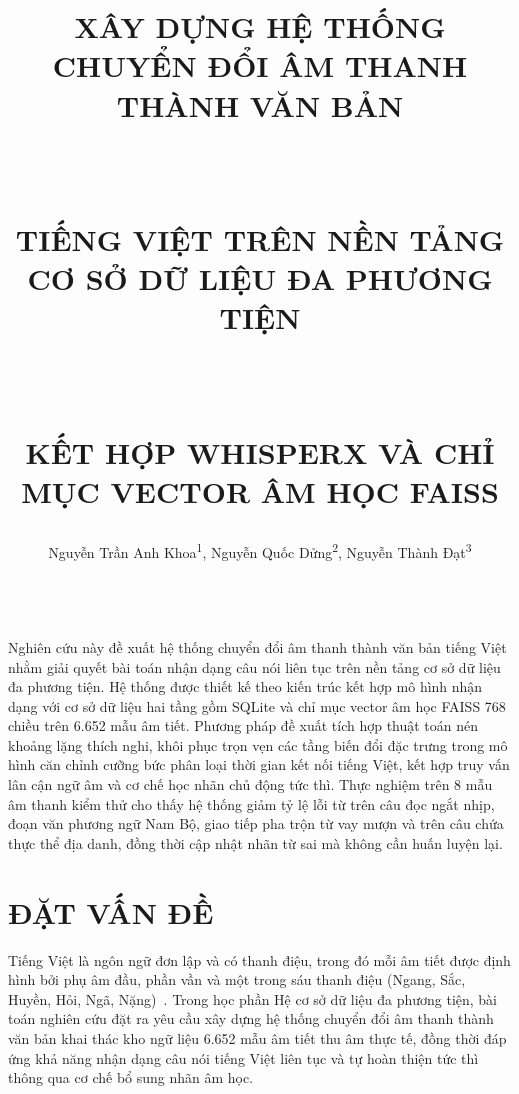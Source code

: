 \documentclass[12pt,a4paper]{article}
\title{\parbox{\textwidth}{\centering
  \titlefontsize 
  \setlength{\baselineskip}{16pt}
  \setlength{\lineskip}{0pt}
  \setlength{\lineskiplimit}{-1000pt}
  \strut XÂY DỰNG HỆ THỐNG CHUYỂN ĐỔI ÂM THANH THÀNH VĂN BẢN\strut\\
  \strut TIẾNG VIỆT TRÊN NỀN TẢNG CƠ SỞ DỮ LIỆU ĐA PHƯƠNG TIỆN\strut\\
  \strut KẾT HỢP WHISPERX VÀ CHỈ MỤC VECTOR ÂM HỌC FAISS\strut}}
\author{
  {\authorfontsize Nguyễn Trần Anh Khoa\textsuperscript{1}, Nguyễn Quốc Dửng\textsuperscript{2}, Nguyễn Thành Đạt\textsuperscript{3}}\\[2pt]
  \makebox[\textwidth][r]{\affilfontsize\textsuperscript{1,2,3} Trường Đại học Kỹ thuật - Công nghệ Cần Thơ}\\[2pt]
  \makebox[\textwidth][r]{\affilfontsize\textit{Tác giả liên hệ: Nguyễn Trần Anh Khoa, ntakhoahttt2211026@student.ctuet.edu.vn}}%
}
\date{}
\begin{document}
\maketitle
\thispagestyle{firstpage}

\begin{tomtat}
Nghiên cứu này đề xuất hệ thống chuyển đổi âm thanh thành văn bản tiếng Việt nhằm giải quyết bài toán nhận dạng câu nói liên tục trên nền tảng cơ sở dữ liệu đa phương tiện. Hệ thống được thiết kế theo kiến trúc kết hợp mô hình nhận dạng với cơ sở dữ liệu hai tầng gồm SQLite và chỉ mục vector âm học FAISS 768 chiều trên 6.652 mẫu âm tiết. Phương pháp đề xuất tích hợp thuật toán nén khoảng lặng thích nghi, khôi phục trọn vẹn các tầng biến đổi đặc trưng trong mô hình căn chỉnh cưỡng bức phân loại thời gian kết nối tiếng Việt, kết hợp truy vấn lân cận ngữ âm và cơ chế học nhãn chủ động tức thì. Thực nghiệm trên 8 mẫu âm thanh kiểm thử cho thấy hệ thống giảm tỷ lệ lỗi từ trên câu đọc ngắt nhịp, đoạn văn phương ngữ Nam Bộ, giao tiếp pha trộn từ vay mượn và trên câu chứa thực thể địa danh, đồng thời cập nhật nhãn từ sai mà không cần huấn luyện lại.
\end{tomtat}


\section{ĐẶT VẤN ĐỀ}
Tiếng Việt là ngôn ngữ đơn lập và có thanh điệu, trong đó mỗi âm tiết được định hình bởi phụ âm đầu, phần vần và một trong sáu thanh điệu (Ngang, Sắc, Huyền, Hỏi, Ngã, Nặng)~\cite{rabiner1993}. Trong học phần Hệ cơ sở dữ liệu đa phương tiện, bài toán nghiên cứu đặt ra yêu cầu xây dựng hệ thống chuyển đổi âm thanh thành văn bản khai thác kho ngữ liệu 6.652 mẫu âm tiết thu âm thực tế, đồng thời đáp ứng khả năng nhận dạng câu nói tiếng Việt liên tục và tự hoàn thiện tức thì thông qua cơ chế bổ sung nhãn âm học.
\end{document}
